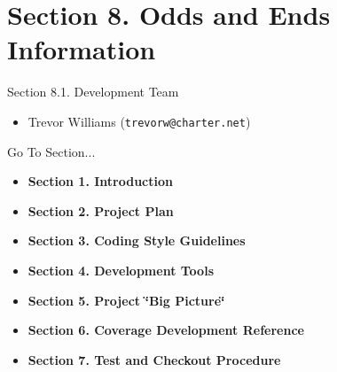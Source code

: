 \section{Section 8.  Odds and Ends Information}\label{page_misc}
\begin{Desc}
\item[Section 8.1. Development Team]\begin{itemize}
\item Trevor Williams ({\tt trevorw@charter.net})\end{itemize}
\end{Desc}




\begin{Desc}
\item[Go To Section...]\begin{itemize}
\item {\bf Section 1.  Introduction} \item {\bf Section 2.  Project Plan} \item {\bf Section 3.  Coding Style Guidelines} \item {\bf Section 4.  Development Tools} \item {\bf Section 5.  Project \char`\"{}Big Picture\char`\"{}} \item {\bf Section 6.  Coverage Development Reference} \item {\bf Section 7.  Test and Checkout Procedure} \end{itemize}
\end{Desc}
